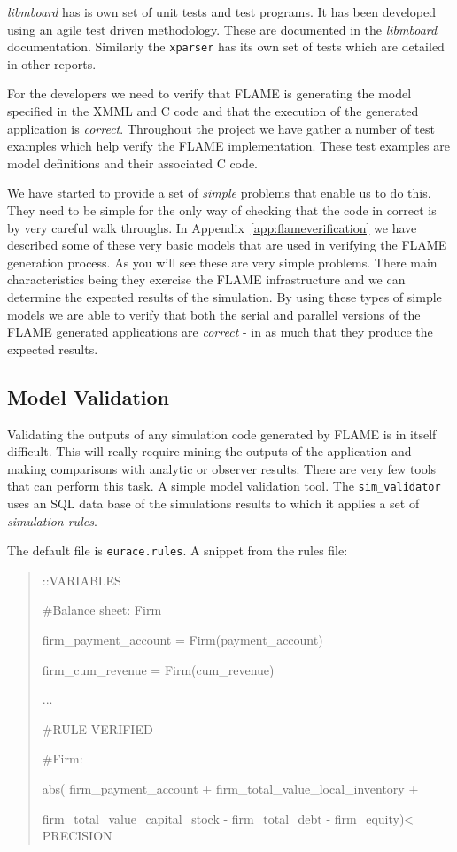 \textit{libmboard} has is own set of unit tests and test programs. It has been developed using an agile test driven methodology. These are documented in the \textit{libmboard} documentation. Similarly the \texttt{xparser} has its own set of tests which are detailed in other reports.


For the developers we need to verify that FLAME is generating the model specified in the XMML and C code and that the execution of the generated application is \textit{correct}. Throughout the project we have gather a number of test examples which help verify the FLAME implementation. These test examples are model definitions and their associated C code. 


We have started to provide a set of \textit{simple} problems that enable us to do this. They need to be simple for the only way of checking that the code in correct is by very careful walk throughs. In Appendix~\ref{app:flameverification} we have described some of these very basic models that are used in verifying the FLAME generation process. As you will see these are very simple problems. There main characteristics being they exercise the FLAME infrastructure and we can determine the expected results of the simulation. By using these types of simple models we are able to verify that both the serial and parallel versions of the FLAME generated applications are \textit{correct} - in as much that they produce the expected results.


\subsection{Model Validation}

Validating the outputs of any simulation code generated by FLAME is in itself difficult. This will really require mining the outputs of the application and making comparisons with analytic or observer results. There are very few tools that can perform this task. A simple model validation tool. The \texttt{sim\_validator} uses an SQL data base of the simulations results to which it applies a set of \textit{simulation rules}.


The default file is \texttt{eurace.rules}. A snippet from the rules file:

\begin{quote}

\small\tt

::VARIABLES

\#Balance sheet: Firm

firm\_payment\_account = Firm(payment\_account)

firm\_cum\_revenue = Firm(cum\_revenue)

...

\#RULE VERIFIED

\#Firm:

abs( firm\_payment\_account + firm\_total\_value\_local\_inventory + 

firm\_total\_value\_capital\_stock - firm\_total\_debt - firm\_equity)< PRECISION

\end{quote}

